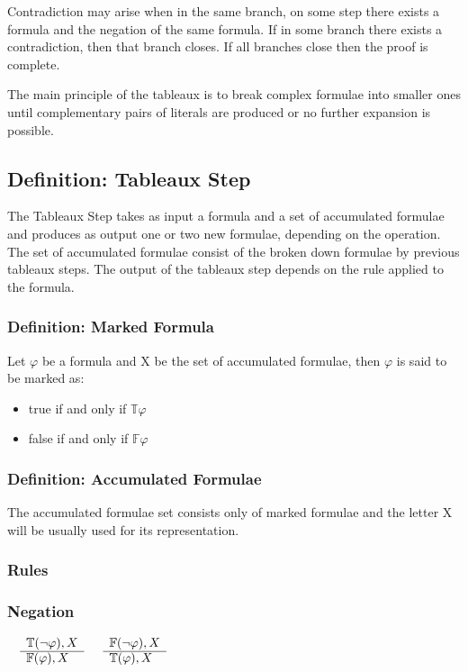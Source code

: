 \documentclass{article}
\begin{document}
	Contradiction may arise when in the same branch, on some step there exists a formula and the negation of the same formula.
	If in some branch there exists a contradiction, then that branch closes. If all branches close then the proof is complete.
	
	The main principle of the tableaux is to break complex formulae into smaller ones until complementary pairs of literals are
	produced or no further expansion is possible.

	\subsection{Definition: Tableaux Step}
		The Tableaux Step takes as input a formula and a set of accumulated formulae and produces as 
		output one or two new formulae, depending on the operation. 
		The set of accumulated formulae consist of the broken down formulae by previous tableaux steps.
		The output of the tableaux step depends on the rule applied to the formula.

		\subsubsection*{Definition: Marked Formula} 
			Let $\varphi$ be a formula and X be the set of accumulated formulae, then $\varphi$ is said to be marked as:
			\begin{itemize}
				\item true if and only if $\mathbb{T}\varphi$
				\item false if and only if $\mathbb{F}\varphi$
			\end{itemize}

		\subsubsection*{Definition: Accumulated Formulae}
			The accumulated formulae set consists only of marked formulae and the letter X will be usually used for its representation.

		\subsubsection{Rules}
		\subsubsection*{Negation}
			$\begin{array}{rl}
				& \mathbb{T}(\neg \varphi), X \\
			      \cline{2-2}
			      & \mathbb{F}(\varphi), X
			\end{array}$
			\:\:\:\:\:\:\:\:\:\:\:\:\:\:\:\:\:\:\:\:\:\:\:\:\:\:\:\:\:\:\:\:\:\:\:\:\:\:\:\:\:\:\:\:\:\:\:\:
			$\begin{array}{rl}
				& \mathbb{F}(\neg \varphi), X \\
			      \cline{2-2}
			      & \mathbb{T}(\varphi), X
			\end{array}$
\end{document}
